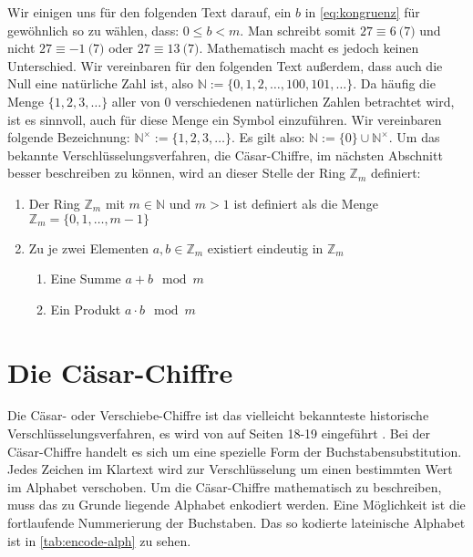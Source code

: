 \noindent
Wir einigen uns für den folgenden Text darauf, ein $b$ in
\eqref{eq:kongruenz} für gewöhn\-lich so zu wählen, dass: $0 \leq b < m$.
Man schreibt somit $27 \equiv 6 \pod{7}$ und nicht $27 \equiv -1 \pod{7}$
oder $27 \equiv 13 \pod{7}$.
Mathematisch macht es jedoch keinen Unterschied.
Wir vereinbaren für den folgenden Text außerdem, dass auch die Null eine natürliche Zahl ist,
also $\mathbb{N} := \{0,1,2,\dots, 100, 101, \dots\}$. Da häufig die Menge
$\{1,2,3,\dots\}$ aller von 0 verschiedenen natürlichen Zahlen betrachtet wird, ist
es sinnvoll, auch für diese Menge ein Symbol einzuführen. Wir vereinbaren folgende
Bezeichnung: $\mathbb{N}^\times := \{1,2,3,\dots\}$.
Es gilt also: $\mathbb{N} := \{0\} \cup \mathbb{N}^\times$.
Um das bekannte Verschlüsselungsverfahren, die Cäsar-Chiffre, im nächsten Abschnitt
besser beschreiben zu können, wird an dieser Stelle der Ring $\mathbb{Z}_m$ definiert:

\begin{definition}[Der Ring $\mathbb{Z}_m$ der Reste Modulo $m$]
  \leavevmode
  \begin{enumerate}
    \item Der Ring $\mathbb{Z}_m$ mit $m \in \mathbb{N}$ und $m > 1$ ist
          definiert als die Menge $\mathbb{Z}_m = \{0,1,\dots,m - 1\}$
    \item Zu je zwei Elementen $a,b \in \mathbb{Z}_m$ existiert eindeutig in $\mathbb{Z}_m$
          \begin{enumerate}[topsep=0pt]
            \item Eine Summe $a + b \mod{m}$
            \item Ein Produkt $a \cdot b \mod{m}$
          \end{enumerate}
  \end{enumerate}
\end{definition}

\section{Die Cäsar-Chiffre} \label{sec:shift-cipher}
Die Cäsar- oder Verschiebe-Chiffre ist das vielleicht bekannteste historische Verschlüs\-selungsverfahren,
es wird von \citeauthor{BOOK:crypto} auf Seiten 18-19 eingeführt \parencite*{BOOK:crypto}.
Bei der Cäsar-Chiffre handelt es sich um eine spezielle Form der Buchstabensubstitution.
Jedes Zeichen im Klartext wird zur Verschlüsselung um einen bestimmten Wert
im Alphabet verschoben.
Um die Cäsar-Chiffre mathematisch zu
beschreiben, muss das zu Grunde liegende Alphabet enkodiert werden.
Eine Möglichkeit ist die fortlaufende Nummerierung der Buchstaben. Das so kodierte
lateinische Alphabet ist in \autoref{tab:encode-alph} zu sehen.

